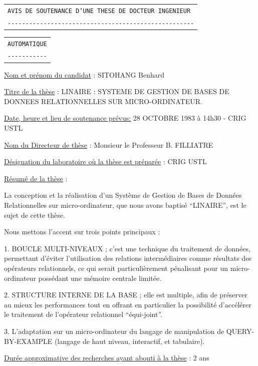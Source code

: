 \begin{center}
\begin{tabular}{@{}l@{}}
\texttt{AVIS DE SOUTENANCE D'UNE THESE DE DOCTEUR INGENIEUR}\\[-.6ex]
\texttt{-{}-{}-{}-{}-{}-{}-{}-{}-{}-{}-{}-{}-{}-{}-{}-{}-{}-{}-{}-{}-{}-{}-{}-{}-{}-{}-{}-{}-{}-{}-{}-{}-{}-{}-{}-{}-{}-{}-{}-{}-{}-{}-{}-{}-{}-{}-{}-{}-{}-{}-{}-}
\end{tabular}

\begin{tabular}{@{}l@{}}
\texttt{AUTOMATIQUE}\\[-.6ex]
\texttt{-{}-{}-{}-{}-{}-{}-{}-{}-{}-{}-}
\end{tabular}
\end{center}

\uline{Nom et prénom du candidat} : SITOHANG Benhard

\uline{Titre de la thèse} : LINAIRE : SYSTEME DE GESTION DE BASES DE DONNEES RELATIONNELLES SUR MICRO-ORDINATEUR.

\uline{Date, heure et lieu de soutenance prévus:} 28 OCTOBRE 1983 à 14h30 - CRIG USTL

\uline{Nom du Directeur de thèse} : Monsieur le Professeur B. FILLIATRE

\uline{Désignation du laboratoire où la thèse est préparée} : CRIG USTL

\uline{Résumé de la thèse} :

La conception et la réalisation d'un Système de Gestion de Bases de Données Relationnelles sur micro-ordinateur, que nous avons baptisé ``LINAIRE'', est le sujet de cette thèse.

Nous mettons l'accent sur trois points principaux :

1. BOUCLE MULTI-NIVEAUX ; c'est une technique du traitement de données, permettant d'éviter l'utilisation des relations intermédiaires comme résultats des opérateurs relationnels, ce qui serait particulièrement pénalisant pour un micro-ordinateur possédant une mémoire centrale limitée.

2. STRUCTURE INTERNE DE LA BASE ; elle est multiple, afin de préserver au mieux les performances tout en offrant en particulier la possibilité d'accélérer le traitement de l'opérateur relationnel ``équi-joint''.

3. L'adaptation sur un micro-ordinateur du langage de manipulation de QUERY-BY-EXAMPLE (langage de haut niveau, interactif, et tabulaire).

\uline{Durée approximative des recherches ayant abouti à la thèse} : 2 ans

